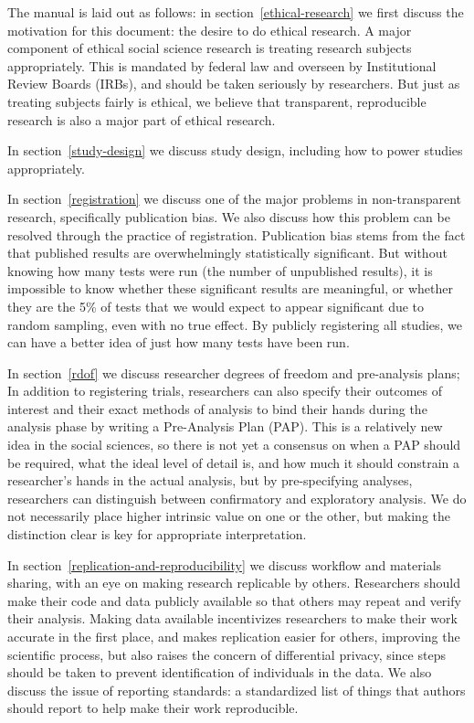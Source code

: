 \documentclass[12pt] {article}
\begin{document}
The manual is laid out as follows: in section~\ref{ethical-research} we first discuss the motivation for this document: the
desire to do ethical research. A major component of ethical social
science research is treating research subjects appropriately. This is
mandated by federal law and overseen by Institutional Review Boards
(IRBs), and should be taken seriously by researchers. But just as
treating subjects fairly is ethical, we believe that transparent,
reproducible research is also a major part of ethical research.

In section~\ref{study-design} we discuss study design, including how to power studies
appropriately.

In section~\ref{registration} we discuss one of the major problems in non-transparent
research, specifically publication bias. We also discuss how this
problem can be resolved through the practice of registration.
Publication bias stems from the fact that published results are
overwhelmingly statistically significant. But without knowing how many
tests were run (the number of unpublished results), it is impossible to know whether these significant
results are meaningful, or whether they are the 5\% of tests that we
would expect to appear significant due to random sampling, even with no
true effect. By publicly registering all studies, we can have a better
idea of just how many tests have been run.

In section~\ref{rdof} we discuss researcher degrees of freedom and pre-analysis
plans; In addition to registering trials, researchers can also
specify their outcomes of interest and their exact methods of analysis
to bind their hands during the analysis phase by writing a Pre-Analysis
Plan (PAP). This is a relatively new idea in the social sciences, so
there is not yet a consensus on when a PAP should be required, what the
ideal level of detail is, and how much it should constrain a
researcher's hands in the actual analysis, but by pre-specifying analyses,
researchers can distinguish between confirmatory and exploratory
analysis. We do not necessarily place higher intrinsic value on one or
the other, but making the distinction clear is key for appropriate
interpretation.

In section~\ref{replication-and-reproducibility} we discuss workflow and materials sharing, with an eye on
making research replicable by others. Researchers should make their code
and data publicly available so that others may repeat and verify their
analysis. Making data available incentivizes researchers to make their
work accurate in the first place, and makes replication easier for
others, improving the scientific process, but also raises the concern of
differential privacy, since steps should be taken to prevent
identification of individuals in the data. We also discuss the issue of
reporting standards: a standardized list of things that authors should
report to help make their work reproducible.
\end{document}
